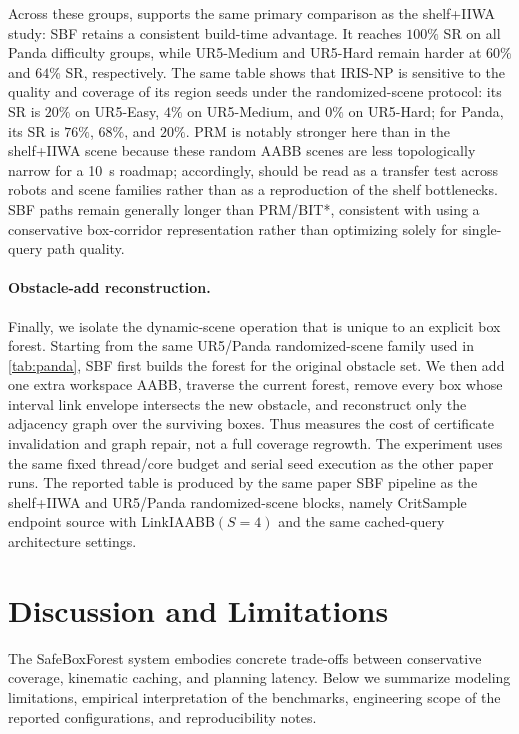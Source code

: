\documentclass[journal]{IEEEtran}
\begin{document}
Across these groups,  supports the same primary comparison as
the shelf+IIWA study: SBF retains a consistent build-time advantage. It
reaches $100\%$ SR on all Panda difficulty groups, while UR5-Medium and
UR5-Hard remain harder at $60\%$ and $64\%$ SR, respectively. The same table
shows that IRIS-NP is sensitive to the quality and coverage of its region seeds
under the randomized-scene protocol: its SR is $20\%$ on UR5-Easy, $4\%$ on
UR5-Medium, and $0\%$ on UR5-Hard; for Panda, its SR is $76\%$, $68\%$, and
$20\%$. PRM is notably stronger here than in the shelf+IIWA scene because these
random AABB scenes are less topologically narrow for a 10~s roadmap;
accordingly,  should be read as a transfer test across robots
and scene families rather than as a reproduction of the shelf bottlenecks. SBF
paths remain generally longer than PRM/BIT*, consistent with using a
conservative box-corridor representation rather than optimizing solely for
single-query path quality.

\paragraph{Obstacle-add reconstruction.}
Finally, we isolate the dynamic-scene operation that is unique to an explicit
box forest. Starting from the same UR5/Panda randomized-scene family used in
\cref{tab:panda}, SBF first builds the forest for the original obstacle set. We
then add one extra workspace AABB,
traverse the current forest, remove every box whose interval link envelope
intersects the new obstacle, and reconstruct only the adjacency graph over the
surviving boxes. Thus  measures the cost of certificate
invalidation and graph repair, not a full coverage regrowth. The experiment
uses the same fixed thread/core budget and serial seed execution as the other
paper runs. The reported table is produced by the same paper SBF pipeline as the
shelf+IIWA and UR5/Panda randomized-scene blocks, namely CritSample endpoint source with
LinkIAABB$(S=4)$ and the same cached-query architecture settings.




\fi

\section{Discussion and Limitations}\label{sec:discussion}

The SafeBoxForest system embodies concrete trade-offs between conservative
coverage, kinematic caching, and planning latency. Below we summarize modeling
limitations, empirical interpretation of the benchmarks, engineering scope of the
reported configurations, and reproducibility notes.
\end{document}
